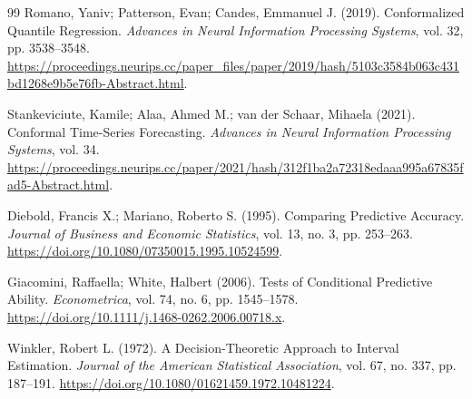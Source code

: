 \begin{thebibliography}{99}
 Romano, Yaniv; Patterson, Evan; Candes, Emmanuel J. (2019). Conformalized Quantile Regression. \emph{Advances in Neural Information Processing Systems}, vol. 32, pp. 3538--3548. \url{https://proceedings.neurips.cc/paper_files/paper/2019/hash/5103c3584b063c431bd1268e9b5e76fb-Abstract.html}.

 Stankeviciute, Kamile; Alaa, Ahmed M.; van der Schaar, Mihaela (2021). Conformal Time-Series Forecasting. \emph{Advances in Neural Information Processing Systems}, vol. 34. \url{https://proceedings.neurips.cc/paper/2021/hash/312f1ba2a72318edaaa995a67835fad5-Abstract.html}.

 Diebold, Francis X.; Mariano, Roberto S. (1995). Comparing Predictive Accuracy. \emph{Journal of Business and Economic Statistics}, vol. 13, no. 3, pp. 253--263. \url{https://doi.org/10.1080/07350015.1995.10524599}.

 Giacomini, Raffaella; White, Halbert (2006). Tests of Conditional Predictive Ability. \emph{Econometrica}, vol. 74, no. 6, pp. 1545--1578. \url{https://doi.org/10.1111/j.1468-0262.2006.00718.x}.

 Winkler, Robert L. (1972). A Decision-Theoretic Approach to Interval Estimation. \emph{Journal of the American Statistical Association}, vol. 67, no. 337, pp. 187--191. \url{https://doi.org/10.1080/01621459.1972.10481224}.

\end{thebibliography}
